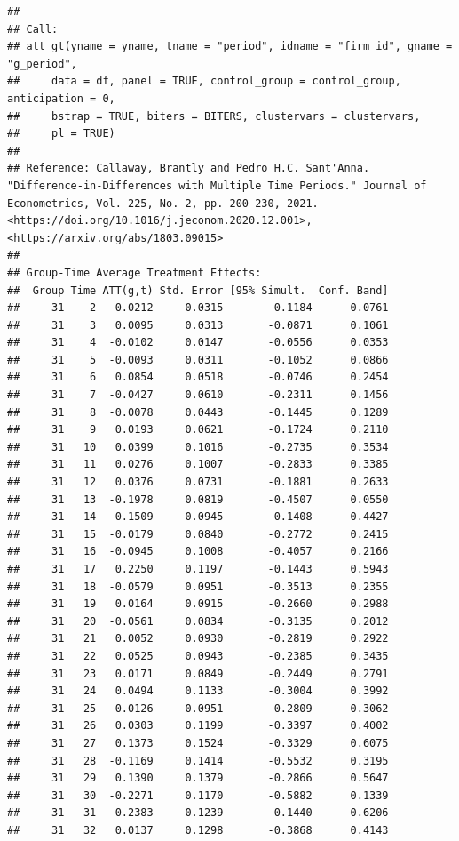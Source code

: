 \documentclass[
]{article}
\begin{document}
\begin{verbatim}
## 
## Call:
## att_gt(yname = yname, tname = "period", idname = "firm_id", gname = "g_period", 
##     data = df, panel = TRUE, control_group = control_group, anticipation = 0, 
##     bstrap = TRUE, biters = BITERS, clustervars = clustervars, 
##     pl = TRUE)
## 
## Reference: Callaway, Brantly and Pedro H.C. Sant'Anna.  "Difference-in-Differences with Multiple Time Periods." Journal of Econometrics, Vol. 225, No. 2, pp. 200-230, 2021. <https://doi.org/10.1016/j.jeconom.2020.12.001>, <https://arxiv.org/abs/1803.09015> 
## 
## Group-Time Average Treatment Effects:
##  Group Time ATT(g,t) Std. Error [95% Simult.  Conf. Band]  
##     31    2  -0.0212     0.0315       -0.1184      0.0761  
##     31    3   0.0095     0.0313       -0.0871      0.1061  
##     31    4  -0.0102     0.0147       -0.0556      0.0353  
##     31    5  -0.0093     0.0311       -0.1052      0.0866  
##     31    6   0.0854     0.0518       -0.0746      0.2454  
##     31    7  -0.0427     0.0610       -0.2311      0.1456  
##     31    8  -0.0078     0.0443       -0.1445      0.1289  
##     31    9   0.0193     0.0621       -0.1724      0.2110  
##     31   10   0.0399     0.1016       -0.2735      0.3534  
##     31   11   0.0276     0.1007       -0.2833      0.3385  
##     31   12   0.0376     0.0731       -0.1881      0.2633  
##     31   13  -0.1978     0.0819       -0.4507      0.0550  
##     31   14   0.1509     0.0945       -0.1408      0.4427  
##     31   15  -0.0179     0.0840       -0.2772      0.2415  
##     31   16  -0.0945     0.1008       -0.4057      0.2166  
##     31   17   0.2250     0.1197       -0.1443      0.5943  
##     31   18  -0.0579     0.0951       -0.3513      0.2355  
##     31   19   0.0164     0.0915       -0.2660      0.2988  
##     31   20  -0.0561     0.0834       -0.3135      0.2012  
##     31   21   0.0052     0.0930       -0.2819      0.2922  
##     31   22   0.0525     0.0943       -0.2385      0.3435  
##     31   23   0.0171     0.0849       -0.2449      0.2791  
##     31   24   0.0494     0.1133       -0.3004      0.3992  
##     31   25   0.0126     0.0951       -0.2809      0.3062  
##     31   26   0.0303     0.1199       -0.3397      0.4002  
##     31   27   0.1373     0.1524       -0.3329      0.6075  
##     31   28  -0.1169     0.1414       -0.5532      0.3195  
##     31   29   0.1390     0.1379       -0.2866      0.5647  
##     31   30  -0.2271     0.1170       -0.5882      0.1339  
##     31   31   0.2383     0.1239       -0.1440      0.6206  
##     31   32   0.0137     0.1298       -0.3868      0.4143  

\end{verbatim}
\end{document}
